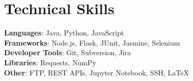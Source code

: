 \documentclass[letterpaper,11pt]{article}
\begin{document}
%
\section{Technical Skills}
 \begin{itemize}[leftmargin=0.15in, label={}]
    \small{\item{
     \textbf{Languages}{: Java, Python, JavaScript} \\
     \textbf{Frameworks}{: Node.js, Flask, JUnit, Jasmine, Selenium} \\
     \textbf{Developer Tools}{: Git, Subversion, Jira} \\
     \textbf{Libraries}{: Requests, NumPy } \\
     \textbf{Other}{: FTP, REST APIs, Jupyter Notebook, SSH, LaTeX}
    }}
 \end{itemize}


\end{document}
